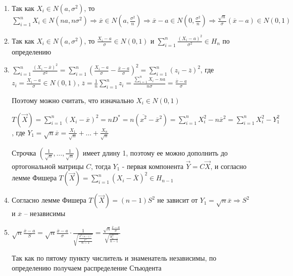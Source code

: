 \begin{MyProof}
    \begin{enumerate}
        \item Так как $X_i \in N(a, \sigma^2)$, то $\sum_{i = 1}^n X_i \in N(na, n\sigma^2) \Longrightarrow \overline{x} \in N\left(a, \frac{\sigma^2}{n}\right) \Longrightarrow
        \overline{x} - a \in N\left(0, \frac{\sigma^2}{n}\right) \Longrightarrow \frac{\sqrt{n}}{\sigma} (\overline{x} - a) \in N(0, 1)$

        \item Так как $X_i \in N(a, \sigma^2)$, то $\frac{X_i - a}{\sigma} \in N(0, 1)$ и $\sum_{i = 1}^n \frac{(X_i - a)^2}{\sigma^2} \in H_n$ по определению
        
        \item $\sum_{i = 1}^n \frac{(X_i - \overline{x})^2}{\sigma^2} = \sum_{i = 1}^n \left(\frac{X_i - a}{\sigma} - \frac{\overline{x} - a}{\sigma}\right)^2 = 
        \sum_{i = 1}^n (z_i - \overline{z})^2$, где $z_i = \frac{X_i - a}{\sigma} \in N(0, 1)$, $\overline{z} = \frac{1}{n} \sum_{i = 1}^n z_i = \frac{\sum_{i = 1}^n X_i - na}{n \sigma} = \frac{\overline{x} - a}{\sigma}$

        Поэтому можно считать, что изначально $X_i \in N(0, 1)$

        $T(\vec X) = \sum_{i = 1}^n \left(X_i - \overline{x}\right)^2 = n D^* = n (\overline{x^2} - \overline{x}^2) = \sum_{i = 1}^n X_i^2 - n\overline{x}^2 = \sum_{i = 1}^n X_i^2 - Y_1^2$, где $Y_1 = \sqrt{n} \overline{x} = \frac{X_1}{\sqrt{n}} + \dots + \frac{X_n}{\sqrt{n}}$

        Строчка $\left(\frac{1}{\sqrt{n}}, \dots, \frac{1}{\sqrt{n}}\right)$ имеет длину 1, поэтому ее можно дополнить до ортогональной матрицы $C$, тогда $Y_1$ - первая компонента $\vec Y = C \vec X$, 
        и согласно лемме Фишера $T(\vec X) = \sum_{i = 1}^n (X_i - \overline{X})^2 \in H_{n - 1}$

        
        \setcounter{enumi}{4}
        \item Согласно лемме Фишера $T(\vec X) = (n - 1) S^2$ не зависит от $Y_1 = \sqrt{n} \overline{x} \Longrightarrow S^2 $ и $\overline{x}$ -- независимы

        \setcounter{enumi}{3}
        \item $\sqrt{n} \frac{\overline{x} - a}{S} = \sqrt{n} \frac{\overline{x} - a}{\sigma} \cdot \frac{1}{\sqrt{\frac{\frac{S^2 (n - 1)}{\sigma^2}}{n - 1}}} = \frac{\sqrt{n} \frac{\overline{x} - a}{\sigma}}{\sqrt{\frac{\chi^2_{n - 1}}{n - 1}}}$

        Так как по пятому пункту числитель и знаменатель независимы, по определению получаем распределение Стьюдента
    \end{enumerate}
\end{MyProof}

